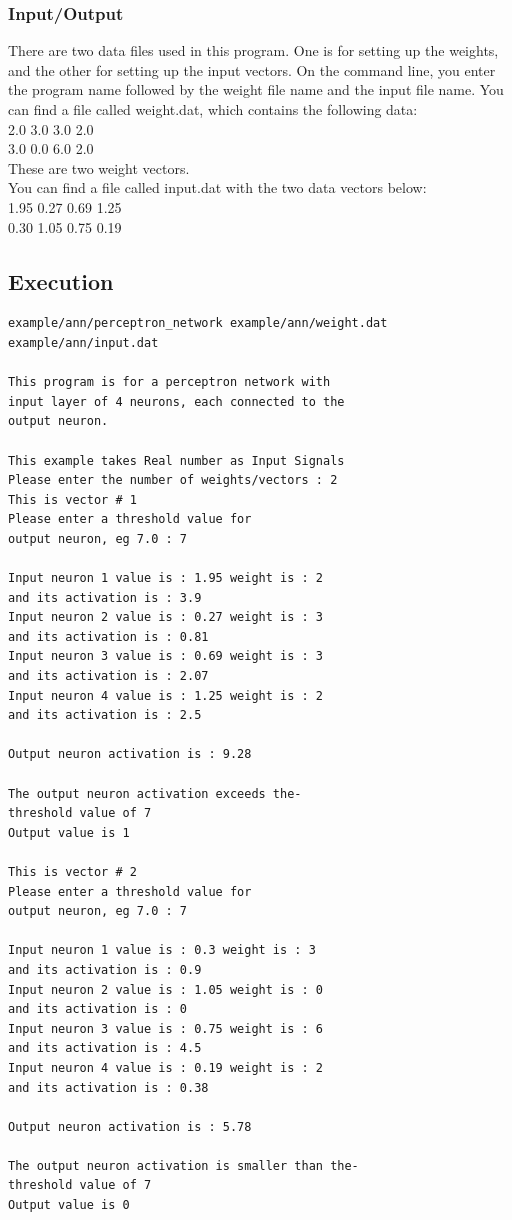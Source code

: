\documentclass[12pt, right open]{memoir}
\begin{document}
\subsubsection{Input/Output}
There are two data files used in this program. One is for setting up the weights, and the other for setting up the input vectors. On the command line, you enter the program name followed by the weight file name and the input file name. 
You can find a file called weight.dat, which contains the following data: \\
2.0 3.0 3.0 2.0 \\
3.0 0.0 6.0 2.0 \\
These are two weight vectors. \\
You can find a file called input.dat with the two data vectors below: \\
1.95 0.27 0.69 1.25 \\
0.30 1.05 0.75 0.19 \\

\subsection{Execution}
\begin{lstlisting}[caption={perceptron\_netwotk.cpp output}] %language=C++, 
example/ann/perceptron_network example/ann/weight.dat example/ann/input.dat

This program is for a perceptron network with  
input layer of 4 neurons, each connected to the 
output neuron.

This example takes Real number as Input Signals
Please enter the number of weights/vectors : 2
This is vector # 1
Please enter a threshold value for 
output neuron, eg 7.0 : 7

Input neuron 1 value is : 1.95 weight is : 2  
and its activation is : 3.9
Input neuron 2 value is : 0.27 weight is : 3  
and its activation is : 0.81
Input neuron 3 value is : 0.69 weight is : 3  
and its activation is : 2.07
Input neuron 4 value is : 1.25 weight is : 2  
and its activation is : 2.5

Output neuron activation is : 9.28

The output neuron activation exceeds the-
threshold value of 7
Output value is 1

This is vector # 2
Please enter a threshold value for 
output neuron, eg 7.0 : 7

Input neuron 1 value is : 0.3 weight is : 3  
and its activation is : 0.9
Input neuron 2 value is : 1.05 weight is : 0  
and its activation is : 0
Input neuron 3 value is : 0.75 weight is : 6  
and its activation is : 4.5
Input neuron 4 value is : 0.19 weight is : 2  
and its activation is : 0.38

Output neuron activation is : 5.78

The output neuron activation is smaller than the- 
threshold value of 7
Output value is 0
\end{lstlisting}
\end{document}
